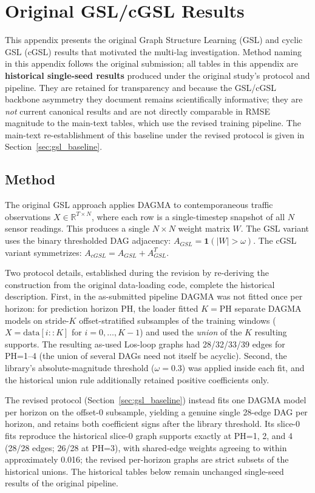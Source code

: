 \section{Original GSL/cGSL Results}\label{app:original_gsl}

This appendix presents the original Graph Structure Learning (GSL) and cyclic GSL (cGSL) results that motivated the multi-lag investigation. Method naming in this appendix follows the original submission; all tables in this appendix are \textbf{historical single-seed results} produced under the original study's protocol and pipeline. They are retained for transparency and because the GSL/cGSL backbone asymmetry they document remains scientifically informative; they are \emph{not} current canonical results and are not directly comparable in RMSE magnitude to the main-text tables, which use the revised training pipeline. The main-text re-establishment of this baseline under the revised protocol is given in Section~\ref{sec:gsl_baseline}.

\subsection{Method}

The original GSL approach applies DAGMA to contemporaneous traffic observations $X \in \mathbb{R}^{T \times N}$, where each row is a single-timestep snapshot of all $N$ sensor readings. This produces a single $N \times N$ weight matrix $W$. The GSL variant uses the binary thresholded DAG adjacency: $A_{GSL} = \mathbf{1}(|W| > \omega)$. The cGSL variant symmetrizes: $A_{cGSL} = A_{GSL} + A_{GSL}^T$.

Two protocol details, established during the revision by re-deriving the construction from the original data-loading code, complete the historical description. First, in the as-submitted pipeline DAGMA was not fitted once per horizon: for prediction horizon PH, the loader fitted $K = \mathrm{PH}$ separate DAGMA models on stride-$K$ offset-stratified subsamples of the training windows ($X = \mathrm{data}[i::K]$ for $i = 0, \ldots, K{-}1$) and used the \emph{union} of the $K$ resulting supports. The resulting as-used Los-loop graphs had 28/32/33/39 edges for PH=1--4 (the union of several DAGs need not itself be acyclic). Second, the library's absolute-magnitude threshold ($\omega = 0.3$) was applied inside each fit, and the historical union rule additionally retained positive coefficients only.

The revised protocol (Section~\ref{sec:gsl_baseline}) instead fits one DAGMA model per horizon on the offset-0 subsample, yielding a genuine single 28-edge DAG per horizon, and retains both coefficient signs after the library threshold. Its slice-0 fits reproduce the historical slice-0 graph supports exactly at PH=1, 2, and 4 (28/28 edges; 26/28 at PH=3), with shared-edge weights agreeing to within approximately 0.016; the revised per-horizon graphs are strict subsets of the historical unions. The historical tables below remain unchanged single-seed results of the original pipeline.

